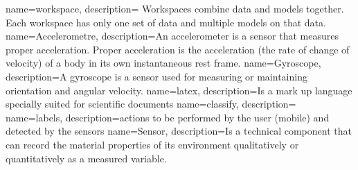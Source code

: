 {
    name={workspace},
    description={%
        Workspaces combine data and models together. Each workspace has only one set of data and multiple models on that data.
    }
}
{
    name={Accelerometre},
    description={An accelerometer is a sensor that measures proper acceleration. Proper acceleration is the acceleration (the rate of change of velocity) of a body in its own instantaneous rest frame.
    }
}
{
    name={Gyroscope},
    description={A gyroscope is a sensor used for measuring or maintaining orientation and angular velocity. 
    }
}
{
    name={latex},
    description={Is a mark up language specially suited for scientific documents}
}
{
    name={classify},
    description={}
}
{
    name={labels},
    description={actions to be performed by the user (mobile) and detected by the sensors}
}
{
    name={Sensor},
    description={Is a technical component that can record the material properties of its environment qualitatively or quantitatively as a measured variable.}
}